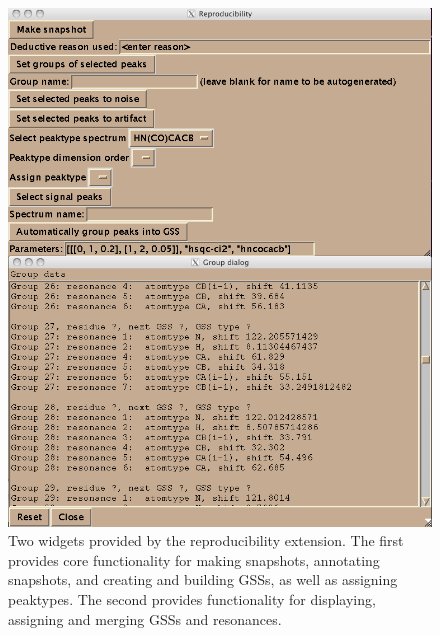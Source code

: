 \begin{figure}
  \includegraphics[scale=0.5]{figures/sparky_reproducibility}
  \caption[Two widgets provided by the reproducibility extension.]
          {Two widgets provided by the reproducibility extension.
           The first provides core functionality for making snapshots,
           annotating snapshots, and creating and building GSSs, as
           well as assigning peaktypes.  The second provides functionality
           for displaying, assigning and merging GSSs and resonances.}
  \label{sparky_reproducibility}
\end{figure}

